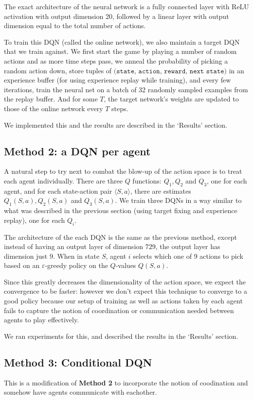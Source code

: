 \documentclass{article}
\begin{document}
The exact architecture of the neural network is
a fully connected layer with ReLU activation
with output dimension 20, followed by
a linear layer with output dimension
equal to the total number of actions.

To train this DQN (called the online network), we also maintain
a target DQN that we train against. We first start the game
by playing a number of random actions and as
more time steps pass, we anneal the
probability of picking a random action down,
store tuples of 
$\texttt{(state, action, reward, next state)}$
in an experience buffer (for using experience
replay while training), and every few iterations,
train the neural net on a batch of 32 randomly
sampled examples from the replay buffer. And
for some $T$, the target network's weights
are updated to those of the online network every
$T$ steps.

We implemented this and the results are described in
the `Results' section.

\subsection{Method 2: a DQN per agent}
A natural step to try next to combat the blow-up
of the action space is to treat each agent
individually. There are three $Q$ functions:
$Q_1, Q_2$ and $Q_3$, one for each agent, and
for each state-action pair $\langle S,a\rangle$,
there are estimates $Q_1(S,a),Q_2(S,a)$ and
$Q_3(S,a)$. We train three DQNs in a way similar
to what was described in the previous section
(using target fixing and experience replay), one for
each $Q_i$.

The architecture of the each DQN is the same as the
previous method, except instead of having an output
layer of dimension $729$, the output layer has dimension
just $9$. When in state $S$, agent $i$ selects which one
of 9 actions to pick based on an $\varepsilon$-greedy policy
on the $Q$-values $Q(S,a)$.

Since this greatly decreases the dimensionality of
the action space, we expect the convergence to be
faster: however we don't expect this technique to
converge to a good policy because our setup
of training as well as actions taken by each agent
fails to capture the notion of coordination or
communication needed between agents to play effectively.

We ran experiments for this, and described the results in
the `Results' section.

\subsection{Method 3: Conditional DQN}
This is a modification of \textbf{Method 2} to incorporate
the notion of coodination and somehow have agents communicate
with eachother.
\end{document}
